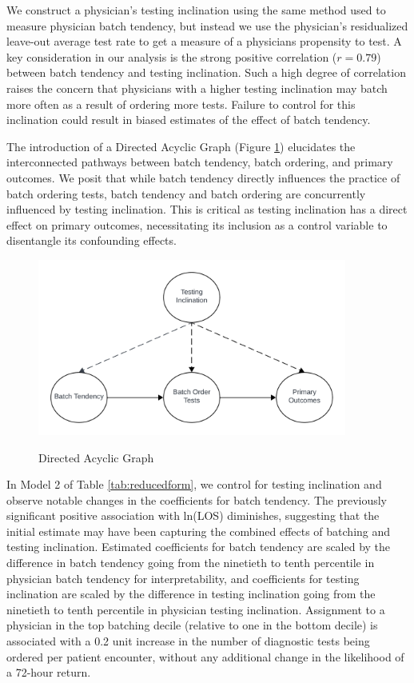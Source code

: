 \documentclass[,,nonblindrev]{informs}
\begin{document}
We construct a physician's testing inclination using the same method
used to measure physician batch tendency, but instead we use the
physician's residualized leave-out average test rate to get a measure of
a physicians propensity to test. A key consideration in our analysis is
the strong positive correlation (\(r = 0.79\)) between batch tendency
and testing inclination. Such a high degree of correlation raises the
concern that physicians with a higher testing inclination may batch more
often as a result of ordering more tests. Failure to control for this
inclination could result in biased estimates of the effect of batch
tendency.

The introduction of a Directed Acyclic Graph (Figure \ref{fig:DAG})
elucidates the interconnected pathways between batch tendency, batch
ordering, and primary outcomes. We posit that while batch tendency
directly influences the practice of batch ordering tests, batch tendency
and batch ordering are concurrently influenced by testing inclination.
This is critical as testing inclination has a direct effect on primary
outcomes, necessitating its inclusion as a control variable to
disentangle its confounding effects.

\begin{figure}[h]
  \centering
  \caption{Directed Acyclic Graph}
  \label{fig:DAG}
  \includegraphics[width=4in]{../outputs/figures/DAG.png}
\begin{tablenotes}
\small
\item \textit{}
\end{tablenotes}  
\end{figure}

In Model 2 of Table \ref{tab:reducedform}, we control for testing
inclination and observe notable changes in the coefficients for batch
tendency. The previously significant positive association with ln(LOS)
diminishes, suggesting that the initial estimate may have been capturing
the combined effects of batching and testing inclination. Estimated
coefficients for batch tendency are scaled by the difference in batch
tendency going from the ninetieth to tenth percentile in physician batch
tendency for interpretability, and coefficients for testing inclination
are scaled by the difference in testing inclination going from the
ninetieth to tenth percentile in physician testing inclination.
Assignment to a physician in the top batching decile (relative to one in
the bottom decile) is associated with a 0.2 unit increase in the number
of diagnostic tests being ordered per patient encounter, without any
additional change in the likelihood of a 72-hour return.
\end{document}
